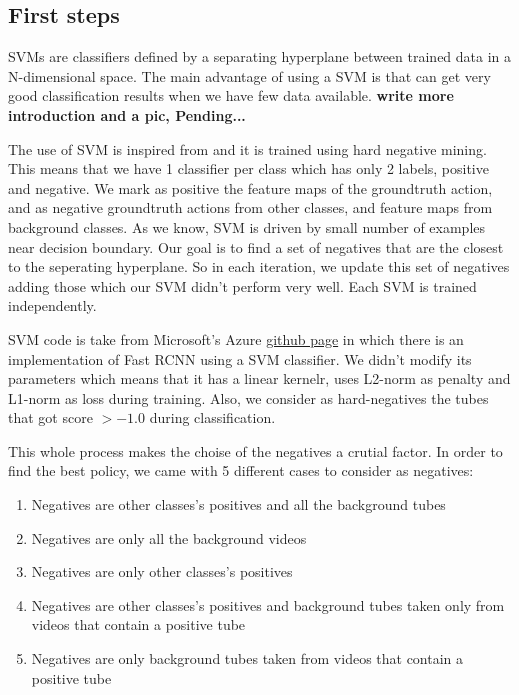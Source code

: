 \documentclass{report}
\begin{document}
\subsection{First steps}
SVMs are classifiers defined by a separating hyperplane between trained data in a N-dimensional space. The main advantage of using a SVM
is that can get very good classification results when we have few data available. 
\textbf{write more introduction and a pic, Pending...} \par
The use of SVM is inspired from \cite{Girshick:2015:FR:2919332.2920125} and it is trained using hard negative mining. 
This means that we have 1 classifier per class which has only 2 labels, positive and negative. We mark as positive the feature maps of the
groundtruth action, and as negative groundtruth actions from other classes, and feature maps from background classes.
As we know, SVM is driven by small number of examples near decision boundary. Our goal is to find a set of negatives that are the closest to
the seperating hyperplane. So in each iteration, we update this set of negatives adding those which our SVM didn't perform very well. Each
SVM is trained independently. \par
SVM code is take from Microsoft's Azure \href{https://github.com/Azure/ObjectDetectionUsingCntk} {github page} in which there is an implementation
of Fast RCNN using a SVM classifier. We didn't modify its parameters which means that it has a linear kernelr, uses  L2-norm as penalty and L1-norm
as loss during training. Also, we consider as hard-negatives the tubes that got score $ >  -1.0 $ during classification.\par
This whole process makes the choise of the negatives a crutial factor. In order to find the best policy,  we came with 5 different cases to consider
as negatives:
\begin{enumerate}
\item Negatives are other classes's positives and all the background tubes
\item Negatives are only all the background videos
\item Negatives are only other classes's positives
\item Negatives are other classes's positives and background tubes taken only from videos that contain a positive tube
\item Negatives are only background tubes taken from videos that contain a positive tube
\end{enumerate}
\end{document}
